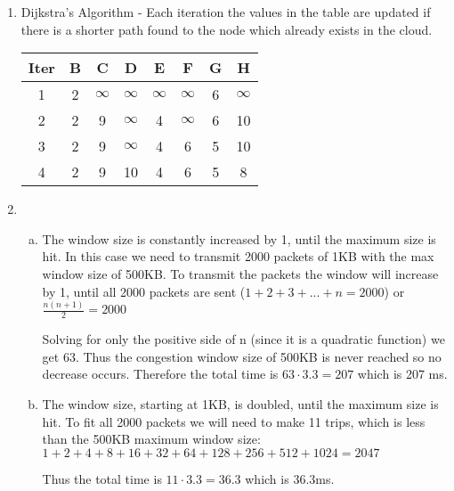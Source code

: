 \documentclass[fleqn, 12pt]{article}
\begin{document}
\begin{enumerate}
        \newpage
    \item
        Dijkstra's Algorithm - Each iteration the values in the table are updated if there is a shorter path found to the node which already exists in the cloud.
    
        \begin{tabular}{|c|c|c|c|c|c|c|c|}
        \hline
             Iter & B & C        & D        & E        & F        & G & H  \\\hline
                1 & 2 & $\infty$ & $\infty$ & $\infty$ & $\infty$ & 6 & $\infty$ \\\hline
                2 & 2 & 9        & $\infty$ & 4        & $\infty$ & 6 & 10       \\\hline
                3 & 2 & 9        & $\infty$ & 4        & 6        & 5 & 10       \\\hline
                4 & 2 & 9        & 10       & 4        & 6        & 5 & 8        \\\hline
        \end{tabular}
        
    \item
        
        \begin{enumerate}[a)]
            \item
                The window size is constantly increased by 1, until the maximum size is hit. In this case we need to transmit 2000 packets of 1KB with the max window size of 500KB. To transmit the packets the window will increase by 1, until all 2000 packets are sent ($1+2+3+...+n=2000$) or $\frac{n(n+1)}{2} = 2000$
                
                Solving for only the positive side of n (since it is a quadratic function) we get 63. Thus the congestion window size of 500KB is never reached so no decrease occurs. Therefore the total time is $63 \cdot 3.3 = 207$ which is 207 ms.
                
            \item
                The window size, starting at 1KB, is doubled, until the maximum size is hit. To fit all 2000 packets we will need to make 11 trips, which is less than the 500KB maximum window size: $1+2+4+8+16+32+64+128+256+512+1024 = 2047$

                Thus the total time is $11 \cdot 3.3 = 36.3$ which is 36.3ms.
        \end{enumerate}
\end{enumerate}
\end{document}
